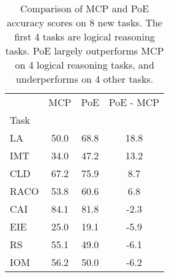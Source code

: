 \begin{table}[h]
\centering
\caption{Comparison of MCP and PoE accuracy scores on 8 new tasks. The first 4 tasks are logical reasoning tasks. PoE largely outperforms MCP on 4 logical reasoning tasks, and underperforms on 4 other tasks.}
\label{tab:logical_reasoning}
\begin{tabular}{l|c|c|c}
 & MCP & PoE & PoE - MCP \\
Task &  &  &  \\
LA & 50.0 & 68.8 & 18.8 \\
IMT & 34.0 & 47.2 & 13.2 \\
CLD & 67.2 & 75.9 & 8.7 \\
RACO & 53.8 & 60.6 & 6.8 \\
CAI & 84.1 & 81.8 & -2.3 \\
EIE & 25.0 & 19.1 & -5.9 \\
RS & 55.1 & 49.0 & -6.1 \\
IOM & 56.2 & 50.0 & -6.2 \\
\end{tabular}
\end{table}
